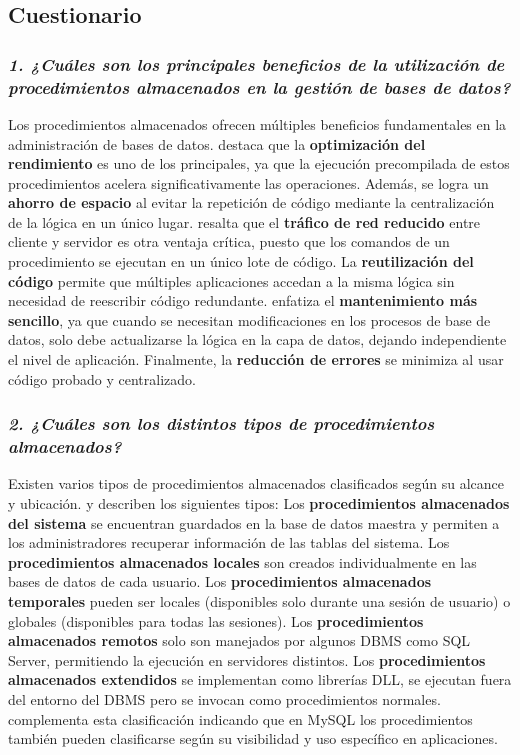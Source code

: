 \subsection*{\textbf{Cuestionario}}

\subsubsection*{\textit{1. ¿Cuáles son los principales beneficios de la utilización de procedimientos almacenados en la gestión de bases de datos?}}

Los procedimientos almacenados ofrecen múltiples beneficios fundamentales en la administración de bases de datos. \parencite{Base100} destaca que la \textbf{optimización del rendimiento} es uno de los principales, ya que la ejecución precompilada de estos procedimientos acelera significativamente las operaciones. Además, se logra un \textbf{ahorro de espacio} al evitar la repetición de código mediante la centralización de la lógica en un único lugar. \parencite{Bosco2020} resalta que el \textbf{tráfico de red reducido} entre cliente y servidor es otra ventaja crítica, puesto que los comandos de un procedimiento se ejecutan en un único lote de código. La \textbf{reutilización del código} permite que múltiples aplicaciones accedan a la misma lógica sin necesidad de reescribir código redundante. \parencite{Gonzales2022} enfatiza el \textbf{mantenimiento más sencillo}, ya que cuando se necesitan modificaciones en los procesos de base de datos, solo debe actualizarse la lógica en la capa de datos, dejando independiente el nivel de aplicación. Finalmente, la \textbf{reducción de errores} se minimiza al usar código probado y centralizado.

\subsubsection*{\textit{2. ¿Cuáles son los distintos tipos de procedimientos almacenados?}}

Existen varios tipos de procedimientos almacenados clasificados según su alcance y ubicación. \parencite{Base100} y \parencite{Bosco2020} describen los siguientes tipos: Los \textbf{procedimientos almacenados del sistema} se encuentran guardados en la base de datos maestra y permiten a los administradores recuperar información de las tablas del sistema. Los \textbf{procedimientos almacenados locales} son creados individualmente en las bases de datos de cada usuario. Los \textbf{procedimientos almacenados temporales} pueden ser locales (disponibles solo durante una sesión de usuario) o globales (disponibles para todas las sesiones). Los \textbf{procedimientos almacenados remotos} solo son manejados por algunos DBMS como SQL Server, permitiendo la ejecución en servidores distintos. Los \textbf{procedimientos almacenados extendidos} se implementan como librerías DLL, se ejecutan fuera del entorno del DBMS pero se invocan como procedimientos normales. \parencite{MySQLDocumentation} complementa esta clasificación indicando que en MySQL los procedimientos también pueden clasificarse según su visibilidad y uso específico en aplicaciones.

